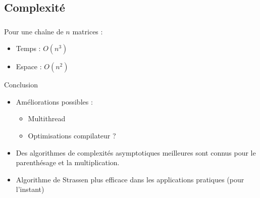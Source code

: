 \documentclass{beamer}
\begin{document}
\subsection{Complexité}
\begin{frame}
  \frametitle{\insertsubsection}
  Pour une chaîne de $n$ matrices :
  \begin{itemize}
    \item Temps : $O(n^3)$
    \item Espace : $O(n^2)$
  \end{itemize}
\end{frame}


\begin{frame}{Conclusion}
  \begin{itemize}
  \item Améliorations possibles :
    \begin{itemize}
    \item Multithread
    \item Optimisations compilateur ?
    \end{itemize}
  \item Des algorithmes de complexités asymptotiques meilleures
    sont connus pour le parenthésage et la multiplication.
  \item Algorithme de Strassen plus efficace dans les
    applications pratiques (pour l'instant)
  \end{itemize}
\end{frame}
\end{document}
